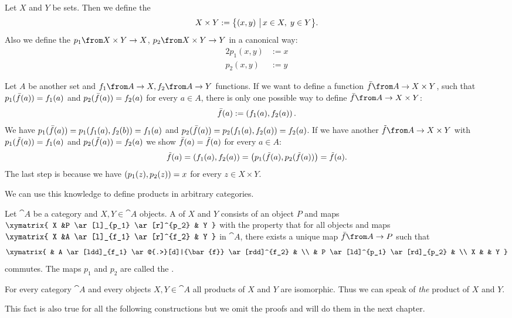 \begin{example}
  \label{ex:prod:cart}
  Let $X$ and $Y$ be sets.
  Then we define the 
  $$X \times Y := \bigl \{ \left( x , y \right) \,\big|\, x \in X, \; y \in Y \bigr \}. $$
  Also we define the  $p_1 \from X \times Y \to X$, $p_2 \from X \times Y \to Y$ in a canonical way:
  \begin{alignat*}{2}
    p_1(x,y) &:= x \\
    p_2(x,y) &:= y
  \end{alignat*}

  Let $A$ be another set and $f_1 \from A \to X, f_2 \from A \to Y$ functions.
  If we want to define a function $\fbar \from A \to X \times Y$, such that
  $p_1(\bar{f}(a)) = f_1(a)$ and $p_2(\bar{f}(a)) = f_2(a)$ for every $a \in A$,
  there is only one possible way to define $\fbar \from A \to X \times Y$:
  $$\bar{f}(a) := \left( f_1(a) , f_2(a) \right).$$
  We have $p_1(\bar{f}(a)) = p_1(f_1(a), f_2(b)) = f_1(a)$ and $p_2(\bar{f}(a)) = p_2(f_1(a), f_2(a)) = f_2(a)$.
  If we have another $\ftilde \from A \to X \times Y$ with $p_1(\tilde{f}(a)) = f_1(a)$ and $p_2(\tilde{f}(a)) = f_2(a)$ we show $\bar{f}(a) = \tilde{f}(a)$ for every $a \in A$:
  $$\tilde{f}(a) = \left( f_1(a) , f_2(a) \right) = \left( p_1(\tilde{f}(a) , p_2(\tilde{f}(a)) \right) = \tilde{f}(a).$$
  The last step is because we have $\left( p_1(z) , p_2(z) \right) = x$ for every $z \in X \times Y$.
\end{example}

We can use this knowledge to define products in arbitrary categories.

\begin{definition}[Product]
  \label{def:prod}
  Let $\cat{A}$ be a category and $X, Y \in \cat{A}$ objects.
  A  of $X$ and $Y$ consists of an object $P$ and maps
  $ \xymatrix{
    X &P \ar[l]_{p_1} \ar[r]^{p_2} & Y
  } $
  with the property that for all objects and maps
  $ \xymatrix{
    X &A \ar[l]_{f_1} \ar[r]^{f_2} & Y
  } $
  in $\cat{A}$, there exists a unique map $\bar{f}\from A \to P$ such that
  \[ \xymatrix{
    & A \ar[ldd]_{f_1} \ar@{.>}[d]|{\bar{f}} \ar[rdd]^{f_2} & \\
    & P \ar[ld]^{p_1} \ar[rd]_{p_2} & \\
    X & & Y
  } \]
  commutes. The maps $p_1$ and $p_2$ are called the .
\end{definition}

\begin{lemma}
  \label{lem:prod:uniq}
  For every category $\cat{A}$ and every objects $X, Y \in \cat{A}$
  all products of $X$ and $Y$ are isomorphic. Thus we can speak of \emph{the} product of $X$ and $Y$.

  This fact is also true for all the following constructions but we omit the proofs and will do them in the next chapter.
\end{lemma}

